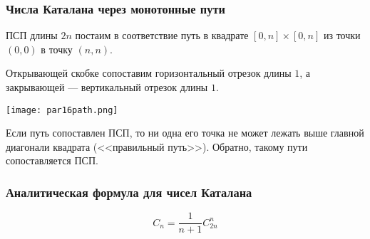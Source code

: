 \subsubsection*{Числа Каталана через монотонные пути}

ПСП длины $2n$ постаим в соответствие путь в квадрате $[0,n] \times [0,n]$ из точки $(0, 0)$ в точку $(n, n)$.

Открывающей скобке сопоставим горизонтальный отрезок длины $1$, а закрывающей --- вертикальный отрезок длины $1$.

\begin{center}
    \texttt{[image: par16path.png]}
\end{center}
Если путь сопоставлен ПСП, то ни одна его точка не может лежать выше главной диагонали квадрата (<<правильный путь>>). Обратно, такому пути сопоставляется ПСП.

\subsubsection*{Аналитическая формула для чисел Каталана}

\begin{theorem}
    \[ C_n = \frac{1}{n + 1} C_{2n}^n \]
\end{theorem}


